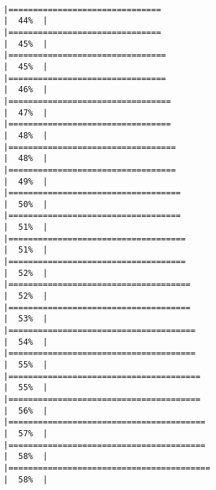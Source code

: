 \documentclass[
]{article}
\begin{document}
\begin{verbatim}
                                                    |===============================                                       |  44%  |                                                                              |===============================                                       |  45%  |                                                                              |================================                                      |  45%  |                                                                              |================================                                      |  46%  |                                                                              |=================================                                     |  47%  |                                                                              |=================================                                     |  48%  |                                                                              |==================================                                    |  48%  |                                                                              |==================================                                    |  49%  |                                                                              |===================================                                   |  50%  |                                                                              |===================================                                   |  51%  |                                                                              |====================================                                  |  51%  |                                                                              |====================================                                  |  52%  |                                                                              |=====================================                                 |  52%  |                                                                              |=====================================                                 |  53%  |                                                                              |======================================                                |  54%  |                                                                              |======================================                                |  55%  |                                                                              |=======================================                               |  55%  |                                                                              |=======================================                               |  56%  |                                                                              |========================================                              |  57%  |                                                                              |========================================                              |  58%  |                                                                              |=========================================                             |  58%  |                           
\end{verbatim}
\end{document}
